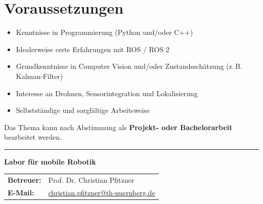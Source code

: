 \documentclass{ohm_project_description}
\begin{document}
\section*{Voraussetzungen}
\begin{itemize}[leftmargin=0.5cm]
    \setlength\itemsep{.1em}
    \item Kenntnisse in Programmierung (Python und/oder C++)
    \item Idealerweise erste Erfahrungen mit ROS / ROS 2
    \item Grundkenntnisse in Computer Vision und/oder Zustandsschätzung (z.\,B. Kalman-Filter)
    \item Interesse an Drohnen, Sensorintegration und Lokalisierung
    \item Selbstständige und sorgfältige Arbeitsweise
\end{itemize}

\vspace{0.5cm}
Das Thema kann nach Abstimmung als \textbf{Projekt- oder Bachelorarbeit} bearbeitet werden.

\vfill
\textcolor{ohm_red}{\rule{\linewidth}{0.4mm}}
\textbf{\textcolor{ohm_red}{Labor für mobile Robotik}} \\
\begin{tabular}{@{}ll}
\textbf{Betreuer:} & Prof. Dr. Christian Pfitzner \\
\textbf{E-Mail:}   & \href{mailto:christian.pfitzner@th-nuernberg.de}{christian.pfitzner@th-nuernberg.de} \\
\end{tabular}
\end{document}

